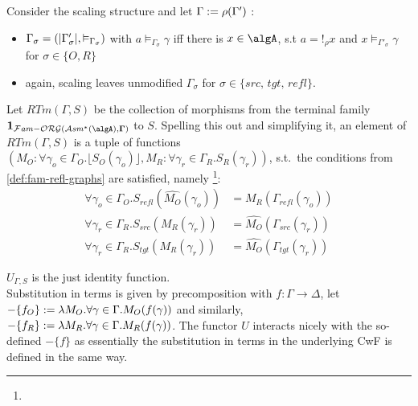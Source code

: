 \documentclass[12pt,a4paper]{article}
\def\cAsm{\mathcal{A}\mathit{sm}^*(\algA)}
\def\cFamORG{\mathcal{F}\mathit{am-}\mathcal{ORG}}
\def\src{_{src}}
\def\rfl{_{refl}}
\def\tgt{_{tgt}}
\renewcommand{\O}{_{O}}\alwaysmath{O}
\newcommand{\R}{\ensuremath{_{R}}}
\begin{document}
Consider the scaling structure and let $\Gamma := \rho(\Gamma')$ :
  \begin{itemize}
    \item $\Gamma_\sigma = (|\Gamma'_\sigma|, \vDash_{\Gamma_\sigma})$ with $a \vDash_{\Gamma_\sigma} \gamma$ iff there is $x \in \algA$, s.t $a = !_\rho x$ and $x \vDash_{\Gamma'_\sigma} \gamma$ for $\sigma \in \{O, R\}$
    
    \item again, scaling leaves unmodified $\Gamma_\sigma$ for $\sigma\in  \{src,\, tgt,\, refl \}$.
\end{itemize}

Let $RTm(\Gamma, S)$ be the collection of morphisms from the terminal family $\terminal{\cFamORG(\cAsm, \Gamma)}$ to $S$. Spelling this out and simplifying it, an element of $RTm(\Gamma, S)$ is a tuple of functions $(M\O: \forall \gamma_o \in \Gamma\O.\lfloor S\O(\gamma_o) \rfloor, M\R : \forall \gamma_r \in \Gamma\R. S\R(\gamma_r))$, s.t.\ the conditions from \cref{def:fam-refl-graphs} are satisfied, namely \footnote{}:
\begin{align*}
\forall \gamma_o \in \Gamma\O. {S\rfl} (\widehat{M\O}(\gamma_o)) &= M\R(\Gamma\rfl(\gamma_o))\\
\forall \gamma_r \in \Gamma\R. {S\src} (M\R(\gamma_r)) &= \widehat{M\O}(\Gamma\src(\gamma_r))\\
\forall \gamma_r \in \Gamma\R. {S\tgt} (M\R(\gamma_r)) &= \widehat{M\O}(\Gamma\tgt(\gamma_r))
\end{align*}

$U_{\Gamma,S}$ is the just identity function.\\
Substitution in terms is given by precomposition with $f : \Gamma \to \Delta$, let $-\{f\O\} \define \lambda M\O. \forall \gamma \in \Gamma . M\O(f(\gamma))$ and similarly, $-\{f\R\} \define \lambda M\R . \forall \gamma \in \Gamma . M\R(f(\gamma))$. The functor $U$ interacts nicely with the so-defined $-\{f\}$ as essentially the substitution in terms in the underlying CwF is defined in the same way.\\
\end{document}
